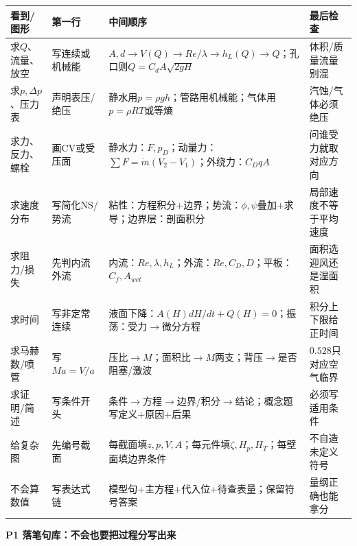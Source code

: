 \documentclass[UTF8,a4paper]{ctexart}
\newcommand{\ftitle}[1]{\vspace{1pt}\textbf{\textcolor{B}{#1}}\par\vspace{0.5pt}}
\begin{document}
\begin{tabular}{|L{0.19\textwidth}|L{0.23\textwidth}|L{0.34\textwidth}|L{0.19\textwidth}|}\hline
\textbf{看到/图形} & \textbf{第一行} & \textbf{中间顺序} & \textbf{最后检查}\\\hline
求$Q$、流量、放空 & 写连续或机械能 & $A,d\to V(Q)\to Re/\lambda\to h_L(Q)\to Q$；孔口则$Q=C_dA\sqrt{2gH}$ & 体积/质量流量别混 \\\hline
求$p,\Delta p$、压力表 & 声明表压/绝压 & 静水用$p=\rho gh$；管路用机械能；气体用$p=\rho RT$或等熵 & 汽蚀/气体必须绝压 \\\hline
求力、反力、螺栓 & 画CV或受压面 & 静水力：$F,p_D$；动量力：$\sum F=\dot m(V_2-V_1)$；外绕力：$C_DqA$ & 问谁受力就取对应方向 \\\hline
求速度分布 & 写简化NS/势流 & 粘性：方程积分+边界；势流：$\phi,\psi$叠加+求导；边界层：剖面积分 & 局部速度不等于平均速度 \\\hline
求阻力/损失 & 先判内流外流 & 内流：$Re,\lambda,h_L$；外流：$Re,C_D,D$；平板：$C_f,A_{wet}$ & 面积选迎风还是湿面积 \\\hline
求时间 & 写非定常连续 & 液面下降：$A(H)dH/dt+Q(H)=0$；振荡：受力$\to$微分方程 & 积分上下限给正时间 \\\hline
求马赫数/喷管 & 写$Ma=V/a$ & 压比$\to M$；面积比$\to M$两支；背压$\to$是否阻塞/激波 & $0.528$只对应空气临界 \\\hline
求证明/简述 & 写条件开头 & 条件$\to$方程$\to$边界/积分$\to$结论；概念题写定义+原因+后果 & 必须写适用条件 \\\hline
给复杂图 & 先编号截面 & 每截面填$z,p,V,A$；每元件填$\zeta,H_p,H_T$；每壁面填边界条件 & 不自造未定义符号 \\\hline
不会算数值 & 写表达式链 & 模型句+主方程+代入位+待查表量；保留符号答案 & 量纲正确也能拿分 \\\hline
\end{tabular}
\ftitle{P1 落笔句库：不会也要把过程分写出来}
\end{document}
